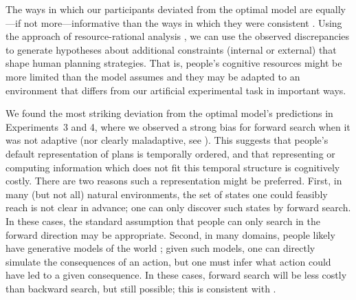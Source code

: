 The ways in which our participants deviated from the optimal model are equally---if not more---informative than the ways in which they were consistent \citep{norris2021more}. Using the approach of resource-rational analysis \citep{griffiths2015rational,lieder2020resourcerational}, we can use the observed discrepancies to generate hypotheses about additional constraints (internal or external) that shape human planning strategies. That is, people's cognitive resources might be more limited than the model assumes and they may be adapted to an environment that differs from our artificial experimental task in important ways.

We found the most striking deviation from the optimal model's predictions in Experiments~3 and 4, where we observed a strong bias for forward search when it was not adaptive (nor clearly maladaptive, see ). 
This suggests that people's default representation of plans is temporally ordered, and that representing or computing information which does not fit this temporal structure is cognitively costly.
There are two reasons such a representation might be preferred.
First, in many (but not all) natural environments, the set of states one could feasibly reach is not clear in advance; one can only discover such states by forward search. In these cases, the standard assumption that people can only search in the forward direction \citep{keramati2016adaptive,vanopheusden2017computational,huys2012bonsai,snider2015prospective} may be appropriate. Second, in many domains, people likely have generative models of the world \citep{battaglia2013simulation,jara-ettinger2016naive}; given such models, one can directly simulate the consequences of an action, but one must infer what action could have led to a given consequence. In these cases, forward search will be less costly than backward search, but still possible; this is consistent with .


